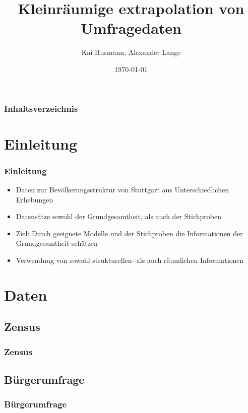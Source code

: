 \documentclass{beamer}\usepackage[]{graphicx}\usepackage[]{color}
\begin{document}
\title{Kleinräumige extrapolation von Umfragedaten}   
\author{Kai Husmann, Alexander Lange} 
\date{\today}

\begin{frame}
\titlepage
\end{frame}

\begin{frame}
\frametitle{Inhaltsverzeichnis}\tableofcontents
\end{frame}


\section{Einleitung} 
\begin{frame}\frametitle{Einleitung} 
\begin{itemize}
\item Daten zur Bevölkerungsstruktur von Stuttgart aus Unterschiedlichen Erhebungen
\item Datensätze sowohl der Grundgesamtheit, als auch der Stichproben 
\item Ziel: Durch geeignete Modelle und der Stichproben die Informationen der Grundgesamtheit schätzen 
\item Verwendung von sowohl strukturellen- als auch räumlichen Informationen
\end{itemize}
\end{frame}

\section{Daten} 
\subsection{Zensus}
\begin{frame}\frametitle{Zensus}

\end{frame}

\subsection{Bürgerumfrage}
\begin{frame}\frametitle{Bürgerumfrage}

\end{frame}
\end{document}
